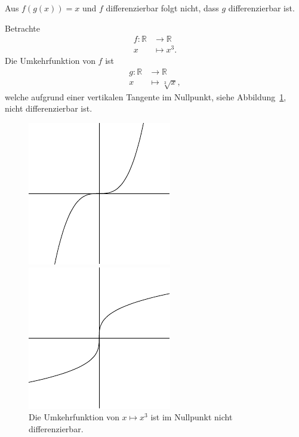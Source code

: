 \documentclass[../main.tex]{subfiles}
\begin{document}
\begin{warning}
  Aus $f(g(x)) = x$ und $f$ differenzierbar
  folgt nicht, dass $g$ differenzierbar ist.
\end{warning}

\begin{example}
  Betrachte
  \begin{align*}
    f \colon \mathbb{R} & \to \mathbb{R} \\
    x & \mapsto x^3.
  \end{align*}
  Die Umkehrfunktion von $f$ ist
  \begin{align*}
    g \colon \mathbb{R} & \to \mathbb{R} \\
    x & \mapsto \sqrt[3]{x},
  \end{align*}
  welche aufgrund einer vertikalen Tangente im
  Nullpunkt, siehe Abbildung~\ref{fig:cube},
  nicht differenzierbar ist.
  
\end{example}

\begin{figure}[htb] 
  \centering
  \begin{minipage}{0.40\textwidth}
    \centering
    \includegraphics{images/cube-1}
  \end{minipage}%
  \begin{minipage}{0.40\textwidth}
    \centering
    \includegraphics{images/cube-2}
  \end{minipage}%
  \caption{Die Umkehrfunktion von $x \mapsto x^3$
  ist im Nullpunkt nicht differenzierbar.}%
  \label{fig:cube}
\end{figure}
\end{document}
